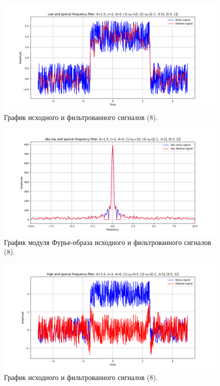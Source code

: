 \documentclass[a4paper, 12pt]{article}
\begin{document}
    \begin{figure}[H]
        \centering
        \includegraphics[scale=0.48]{8_3_u_flt_u_nospec.png}
        \captionsetup{skip=0pt}
        \caption{График исходного и фильтрованного сигналов (8).}
        \label{fig:snf}
    \end{figure}
    \begin{figure}[!htb]
        \centering
        \includegraphics[scale=0.48]{8_3_abs_u_U_nospec.png}
        \captionsetup{skip=0pt}
        \caption{График модуля Фурье-образа исходного и фильтрованного сигналов (8).}
        \label{fig:wkljkf}
    \end{figure}
    \begin{figure}[!htb]
        \centering
        \includegraphics[scale=0.48]{8_4_u_flt_u_nospec.png}
        \captionsetup{skip=0pt}
        \caption{График исходного и фильтрованного сигналов (8).}
        \label{fig:sdfm}
    \end{figure}
\end{document}
